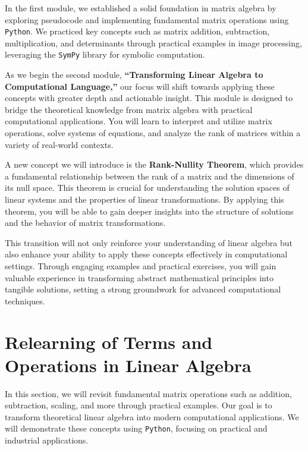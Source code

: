 \documentclass[
  letterpaper,
  DIV=11,
  numbers=noendperiod]{scrreprt}
\theoremstyle{plain}
\theoremstyle{definition}
\theoremstyle{remark}
\begin{document}

In the first module, we established a solid foundation in matrix algebra
by exploring pseudocode and implementing fundamental matrix operations
using \texttt{Python}. We practiced key concepts such as matrix
addition, subtraction, multiplication, and determinants through
practical examples in image processing, leveraging the \texttt{SymPy}
library for symbolic computation.

As we begin the second module, \textbf{``Transforming Linear Algebra to
Computational Language,''} our focus will shift towards applying these
concepts with greater depth and actionable insight. This module is
designed to bridge the theoretical knowledge from matrix algebra with
practical computational applications. You will learn to interpret and
utilize matrix operations, solve systems of equations, and analyze the
rank of matrices within a variety of real-world contexts.

A new concept we will introduce is the \textbf{Rank-Nullity Theorem},
which provides a fundamental relationship between the rank of a matrix
and the dimensions of its null space. This theorem is crucial for
understanding the solution spaces of linear systems and the properties
of linear transformations. By applying this theorem, you will be able to
gain deeper insights into the structure of solutions and the behavior of
matrix transformations.

This transition will not only reinforce your understanding of linear
algebra but also enhance your ability to apply these concepts
effectively in computational settings. Through engaging examples and
practical exercises, you will gain valuable experience in transforming
abstract mathematical principles into tangible solutions, setting a
strong groundwork for advanced computational techniques.

\section*{Relearning of Terms and Operations in Linear
Algebra}\label{relearning-of-terms-and-operations-in-linear-algebra}


In this section, we will revisit fundamental matrix operations such as
addition, subtraction, scaling, and more through practical examples. Our
goal is to transform theoretical linear algebra into modern
computational applications. We will demonstrate these concepts using
\texttt{Python}, focusing on practical and industrial applications.
\end{document}
